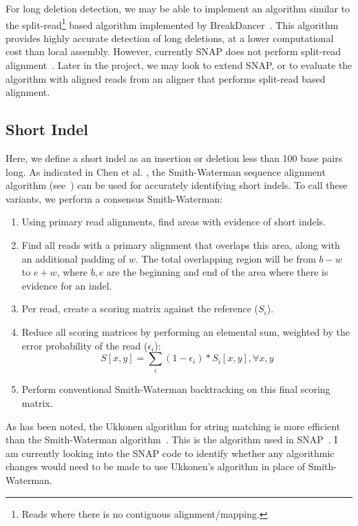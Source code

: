 \documentclass[11pt]{article}
\begin{document}
For long deletion detection, we may be able to implement an algorithm similar to the split-read\footnote{Reads where
there is no contiguous alignment/mapping.} based algorithm implemented by BreakDancer~\cite{chen09}. This
algorithm provides highly accurate detection of long deletions, at a lower computational cost than local assembly.
However, currently SNAP does not perform split-read alignment~\cite{zaharia11}. Later in the project, we may
look to extend SNAP, or to evaluate the algorithm with aligned reads from an aligner that performs split-read based
alignment.

\subsection{Short Indel}
\label{sec:short-indel}

Here, we define a short indel as an insertion or deletion less than 100 base pairs long. As indicated in Chen et al.
\cite{chen09}, the Smith-Waterman sequence alignment algorithm (see~\cite{smith81}) can be used for accurately
identifying short indels. To call these variants, we perform a consensus Smith-Waterman:

\begin{enumerate}
\item Using primary read alignments, find areas with evidence of short indels.
\item Find all reads with a primary alignment that overlaps this area, along with an additional padding of $w$. The total
overlapping region will be from $b - w$ to $e + w$, where $b, e$ are the beginning and end of the area where there is
evidence for an indel.
\item Per read, create a scoring matrix against the reference ($S_i$).
\item Reduce all scoring matrices by performing an elemental sum, weighted by the error probability of the read
($\epsilon_i$):
$$
S [x, y] = \sum_i (1 - \epsilon_i) * S_i [x,y] , \forall x, y
$$
\item Perform conventional Smith-Waterman backtracking on this final scoring matrix.
\end{enumerate}

As has been noted, the Ukkonen algorithm for string matching is more efficient than the Smith-Waterman
algorithm~\cite{ukkonen85}. This is the algorithm used in SNAP~\cite{zaharia11}. I am currently looking into the SNAP
code to identify whether any algorithmic changes would need to be made to use Ukkonen's algorithm in place of
Smith-Waterman.
\end{document}
